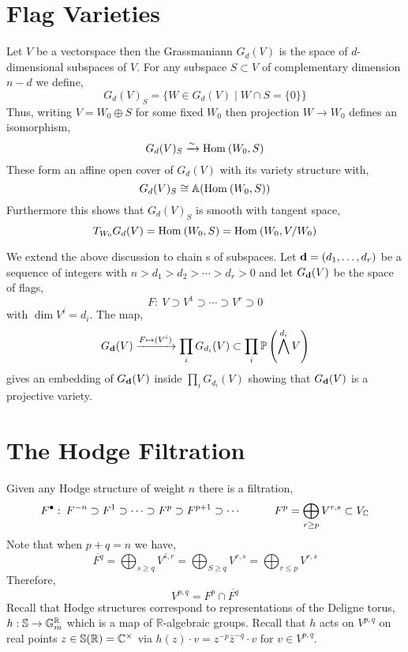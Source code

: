 \documentclass[12pt]{article}
\begin{document}
\newcommand{\R}{\mathbb{R}}
\newcommand{\Lie}[1]{\mathrm{Lie}\left( #1 \right)}
\newcommand{\der}{\mathrm{der}}
\newcommand{\ad}{\mathrm{ad}}
\renewcommand{\S}{\mathbb{S}}

\section{Flag Varieties}

\begin{definition}
Let $V$ be a vectorspace then the Grassmaniann $G_d(V)$ is the space of $d$-dimensional subspaces of $V$. For any subspace $S \subset V$ of complementary dimension $n - d$ we define,
\[ G_d(V)_S = \{ W \in G_d(V) \mid W \cap S = \{ 0 \} \} \]
Thus, writing $V =  W_0 \oplus S$ for some fixed $W_0$ then projection $W \to W_0$ defines an isomorphism,
\[ G_d(V)_S \xrightarrow{\sim} \Hom{}{W_0}{S} \]
These form an affine open cover of $G_d(V)$ with its variety structure with, 
\[ G_d(V)_S \cong \A(\Hom{}{W_0}{S}) \]
Furthermore this shows that $G_d(V)_S$ is smooth with tangent space,
\[ T_{W_0} G_d(V) = \Hom{}{W_0}{S} = \Hom{}{W_0}{V/W_0} \] 
\end{definition}

\begin{definition}
We extend the above discussion to chain s of subspaces. Let $\bf{d} = (d_1, \dots, d_r)$ be a sequence of integers with $n > d_1 > d_2 > \cdots > d_r > 0$ and let $G_{\bf{d}}(V)$ be the space of flags,
\[ F : \: V \supset V^1 \supset \cdots \supset V^r \supset 0 \]
with $\dim{V^i} = d_i$. The map,
\[ G_{\bf{d}}(V) \xrightarrow{F \mapsto (V^i)} \prod_{i} G_{d_i}(V) \subset \prod_i \P\left( \bigwedge^{d_i} V \right) \]
gives an embedding of $G_{\bf{d}}(V)$ inside $\prod_i G_{d_i}(V)$ showing that $G_{\bf{d}}(V)$ is a projective variety.
\end{definition}

\section{The Hodge Filtration}

Given any Hodge structure of weight $n$ there is a filtration,
\[ F^\bullet : \: F^{-n} \supset F^1 \supset \cdots \supset F^p \supset F^{p+1} \supset \cdots \quad \quad \quad F^p = \bigoplus_{r \ge p} V^{r,s} \subset V_\C \]
Note that when $p + q = n$ we have,
\[ \overline{F^q} = \bigoplus_{s \ge q} \overline{V^{s,r}} = \bigoplus_{S \ge q} V^{r,s} = \bigoplus_{r \le p} V^{r,s} \]
Therefore,
\[ V^{p,q} = F^p \cap \overline{F^q} \]
Recall that Hodge structures correspond to representations of the Deligne torus, $h : \S \to \Gm^\R$ which is a map of $\R$-algebraic groups. Recall that $h$ acts on $V^{p,q}$ on real points $z \in \S(\R) = \C^\times$ via $h(z) \cdot v = z^{-p} \bar{z}^{-q} \cdot v$ for $v \in V^{p,q}$. 
\end{document}
